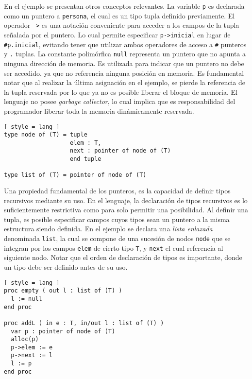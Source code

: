 En el ejemplo se presentan otros conceptos relevantes.
La variable \lstinline[style = lang]{p} es declarada como un puntero a \lstinline[style = lang]{persona}, el cual es un tipo tupla definido previamente.
El operador \lstinline[style = lang]{->} es una notación conveniente para acceder a los campos de la tupla señalada por el puntero.
Lo cual permite especificar \lstinline[style = lang]{p->inicial} en lugar de \lstinline[style = lang]{#p.inicial}, evitando tener que utilizar ambos operadores de acceso a \lstinline[style = lang]{#} punteros y \lstinline[style = lang]{.} tuplas.
La constante polimórfica \lstinline[style = lang]{null} representa un puntero que no apunta a ninguna dirección de memoria.
Es utilizada para indicar que un puntero no debe ser accedido, ya que no referencia ninguna posición en memoria.
Es fundamental notar que al realizar la última asignación en el ejemplo, se pierde la referencia de la tupla reservada por lo que ya no es posible liberar el bloque de memoria.
El lenguaje no posee \textit{garbage collector}, lo cual implica que es responsabilidad del programador liberar toda la memoria dinámicamente reservada.

\begin{lstlisting}[ style = lang ]
type node of (T) = tuple
                   elem : T,
                   next : pointer of node of (T)
                   end tuple
                   
type list of (T) = pointer of node of (T)
\end{lstlisting}

Una propiedad fundamental de los punteros, es la capacidad de definir tipos recursivos mediante su uso.
En el lenguaje, la declaración de tipos recursivos es lo suficientemente restrictiva como para solo permitir una posibilidad.
Al definir una tupla, es posible especificar campos cuyos tipos sean un puntero a la misma estructura siendo definida.
En el ejemplo se declara una \textit{lista enlazada} denominada \lstinline[style = lang]{list}, la cual se compone de una sucesión de nodos \lstinline[style = lang]{node} que se integran por los campos \lstinline[style = lang]{elem} de cierto tipo \lstinline[style = lang]{T}, y \lstinline[style = lang]{next} el cual referencia al siguiente nodo.
Notar que el orden de declaración de tipos es importante, donde un tipo debe ser definido antes de su uso.

\begin{lstlisting}[ style = lang ]
proc empty ( out l : list of (T) )
  l := null
end proc

proc addL ( in e : T, in/out l : list of (T) )
  var p : pointer of node of (T)
  alloc(p)
  p->elem := e
  p->next := l
  l := p
end proc
\end{lstlisting}

